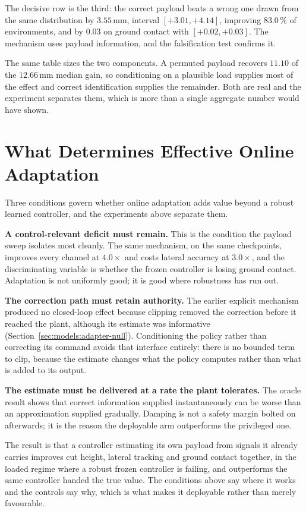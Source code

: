 The decisive row is the third: the correct payload beats a wrong one drawn from
the same distribution by $3.55\,$mm, interval $[+3.01, +4.14]$, improving
$83.0\,\%$ of environments, and by $0.03$ on ground contact with
$[+0.02, +0.03]$. The mechanism uses payload information, and the falsification
test confirms it.

The same table sizes the two components. A permuted payload recovers $11.10$ of
the $12.66\,$mm median gain, so conditioning on a plausible load supplies most
of the effect and correct identification supplies the remainder. Both are real
and the experiment separates them, which is more than a single aggregate number
would have shown.

\section{What Determines Effective Online Adaptation}
\label{sec:eval:discussion}

Three conditions govern whether online adaptation adds value beyond a robust
learned controller, and the experiments above separate them.

\textbf{A control-relevant deficit must remain.} This is the condition the
payload sweep isolates most cleanly. The same mechanism, on the same
checkpoints, improves every channel at $4.0\times$ and costs lateral accuracy at
$3.0\times$, and the discriminating variable is whether the frozen controller is
losing ground contact. Adaptation is not uniformly good; it is good where
robustness has run out.

\textbf{The correction path must retain authority.} The earlier explicit
mechanism produced no closed-loop effect because clipping removed the correction
before it reached the plant, although its estimate was informative
(Section~\ref{sec:models:adapter-null}). Conditioning the policy rather than
correcting its command avoids that interface entirely: there is no bounded term
to clip, because the estimate changes what the policy computes rather than what
is added to its output.

\textbf{The estimate must be delivered at a rate the plant tolerates.} The
oracle result shows that correct information supplied instantaneously can be
worse than an approximation supplied gradually. Damping is not a safety margin
bolted on afterwards; it is the reason the deployable arm outperforms the
privileged one.

The result is that a controller estimating its own payload from signals it
already carries improves cut height, lateral tracking and ground contact
together, in the loaded regime where a robust frozen controller is failing, and
outperforms the same controller handed the true value. The conditions above say
where it works and the controls say why, which is what makes it deployable
rather than merely favourable.
